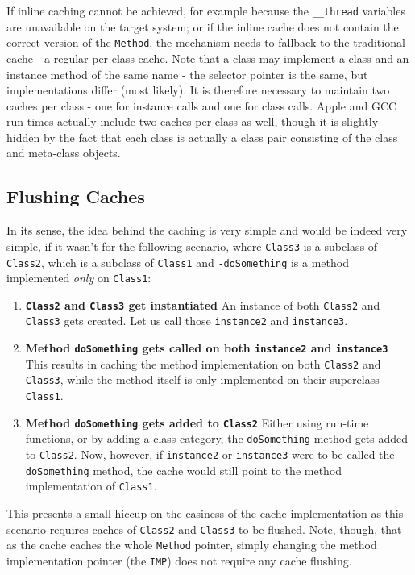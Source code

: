 If inline caching cannot be achieved, for example because the \verb=__thread= variables are unavailable on the target system; or if the inline cache does not contain the correct version of the \verb=Method=, the mechanism needs to fallback to the traditional cache - a regular per-class cache. Note that a class may implement a class and an instance method of the same name - the selector pointer is the same, but implementations differ (most likely). It is therefore necessary to maintain two caches per class - one for instance calls and one for class calls. Apple and GCC run-times actually include two caches per class as well, though it is slightly hidden by the fact that each class is actually a class pair consisting of the class and meta-class objects.

\subsection{Flushing Caches}

In its sense, the idea behind the caching is very simple and would be indeed very simple, if it wasn't for the following scenario, where \verb=Class3= is a subclass of \verb=Class2=, which is a subclass of \verb=Class1= and \verb=-doSomething= is a method implemented \emph{only} on \verb=Class1=:

\begin{enumerate}
  \item{\bf{\verb=Class2= and \verb=Class3= get instantiated}} An instance of both \verb=Class2= and \verb=Class3= gets created. Let us call those \verb=instance2= and \verb=instance3=.
  \item{\bf{Method \verb=doSomething= gets called on both \verb=instance2= and \verb=instance3=}} This results in caching the method implementation on both \verb=Class2= and \verb=Class3=, while the method itself is only implemented on their superclass \verb=Class1=.
  \item{\bf{Method \verb=doSomething= gets added to \verb=Class2=}} Either using run-time functions, or by adding a class category, the \verb=doSomething= method gets added to \verb=Class2=. Now, however, if \verb=instance2= or \verb=instance3= were to be called the \verb=doSomething= method, the cache would still point to the method implementation of \verb=Class1=.
\end{enumerate}

This presents a small hiccup on the easiness of the cache implementation as this scenario requires caches of \verb=Class2= and \verb=Class3= to be flushed. Note, though, that as the cache caches the whole \verb=Method= pointer, simply changing the method implementation pointer (the \verb=IMP=) does not require any cache flushing.

